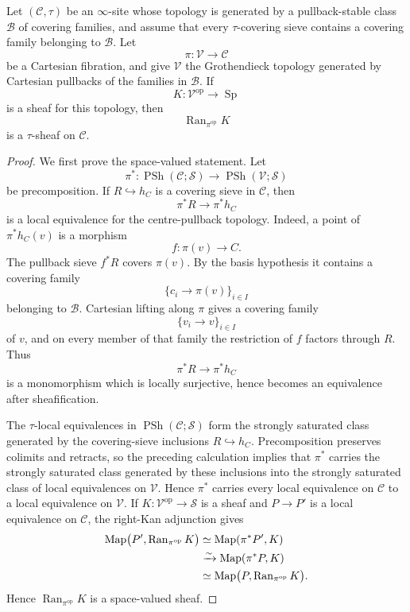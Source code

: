 \begin{lemma}
\label{lem:var-cartesian-centre-kan}
Let \((\mathcal C,\tau)\) be an \(\infty\)-site whose topology is generated by a pullback-stable class \(\mathscr B\) of covering families, and assume that every \(\tau\)-covering sieve contains a covering family belonging to \(\mathscr B\). Let
\[
    \pi:\mathcal V\longrightarrow\mathcal C
\]
be a Cartesian fibration, and give \(\mathcal V\) the Grothendieck topology generated by Cartesian pullbacks of the families in \(\mathscr B\). If
\[
    K:\mathcal V^{\mathrm{op}}\longrightarrow\operatorname{Sp}
\]
is a sheaf for this topology, then
\[
    \operatorname{Ran}_{\pi^{\mathrm{op}}}K
\]
is a \(\tau\)-sheaf on \(\mathcal C\).
\end{lemma}

\begin{proof}
We first prove the space-valued statement. Let
\[
    \pi^*:
    \operatorname{PSh}(\mathcal C;\mathcal S)
    \longrightarrow
    \operatorname{PSh}(\mathcal V;\mathcal S)
\]
be precomposition. If \(R\hookrightarrow h_C\) is a covering sieve in \(\mathcal C\), then
\[
    \pi^*R\longrightarrow\pi^*h_C
\]
is a local equivalence for the centre-pullback topology. Indeed, a point of \(\pi^*h_C(v)\) is a morphism
\[
    f:\pi(v)\longrightarrow C.
\]
The pullback sieve \(f^*R\) covers \(\pi(v)\). By the basis hypothesis it contains a covering family
\[
    \{c_i\longrightarrow\pi(v)\}_{i\in I}
\]
belonging to \(\mathscr B\). Cartesian lifting along \(\pi\) gives a covering family
\[
    \{v_i\longrightarrow v\}_{i\in I}
\]
of \(v\), and on every member of that family the restriction of \(f\) factors through \(R\). Thus
\[
    \pi^*R\longrightarrow\pi^*h_C
\]
is a monomorphism which is locally surjective, hence becomes an equivalence after sheafification.

The \(\tau\)-local equivalences in \(\operatorname{PSh}(\mathcal C;\mathcal S)\) form the strongly saturated class generated by the covering-sieve inclusions \(R\hookrightarrow h_C\). Precomposition preserves colimits and retracts, so the preceding calculation implies that \(\pi^*\) carries the strongly saturated class generated by these inclusions into the strongly saturated class of local equivalences on \(\mathcal V\). Hence \(\pi^*\) carries every local equivalence on \(\mathcal C\) to a local equivalence on \(\mathcal V\). If \(K:\mathcal V^{\mathrm{op}}\to\mathcal S\) is a sheaf and \(P\to P'\) is a local equivalence on \(\mathcal C\), the right-Kan adjunction gives
\[
\begin{aligned}
    \operatorname{Map}\bigl(P',\operatorname{Ran}_{\pi^{\mathrm{op}}}K\bigr)
    &\simeq
    \operatorname{Map}(\pi^*P',K)
    \\
    &\xrightarrow{\sim}
    \operatorname{Map}(\pi^*P,K)
    \\
    &\simeq
    \operatorname{Map}\bigl(P,\operatorname{Ran}_{\pi^{\mathrm{op}}}K\bigr).
\end{aligned}
\]
Hence \(\operatorname{Ran}_{\pi^{\mathrm{op}}}K\) is a space-valued sheaf.


\end{proof}
